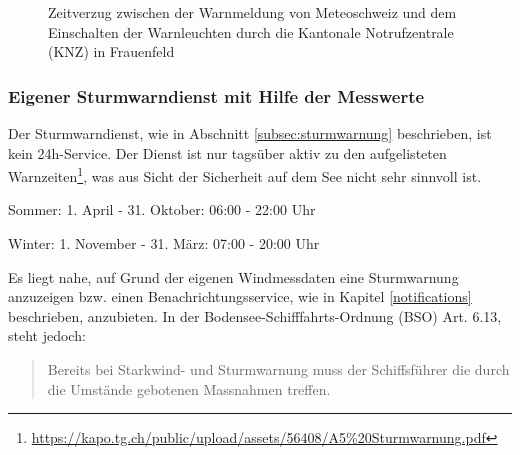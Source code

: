 \begin{figure}[h!]
	\centering
	\caption[Zeitverzug zwischen Sturmwarnmeldung und Anzeige]{Zeitverzug zwischen der Warnmeldung von Meteoschweiz und dem Einschalten der Warnleuchten durch die Kantonale Notrufzentrale (KNZ) in Frauenfeld}
	\label{img:sturmZeit}
\end{figure}


\subsubsection{Eigener Sturmwarndienst mit Hilfe der Messwerte}
Der Sturmwarndienst, wie in Abschnitt \ref{subsec:sturmwarnung} beschrieben, ist kein 24h-Service. Der Dienst ist nur tagsüber aktiv zu den aufgelisteten Warnzeiten\footnote{ \url{https://kapo.tg.ch/public/upload/assets/56408/A5\%20Sturmwarnung.pdf}}, was aus Sicht der Sicherheit auf dem See nicht sehr sinnvoll ist.

\begin{description*}
  \item[Sommer:] 1. April - 31. Oktober: 06:00 - 22:00 Uhr
  \item[Winter: ] 1. November - 31. März: 07:00 - 20:00 Uhr
\end{description*}

\noindent
Es liegt nahe, auf Grund der eigenen Windmessdaten eine Sturmwarnung anzuzeigen bzw. einen Benachrichtungsservice, wie in Kapitel \ref{notifications} beschrieben, anzubieten. In der Bodensee-Schifffahrts-Ordnung (BSO) Art. 6.13, steht jedoch:

\begin{quote}
\flqq Bereits bei Starkwind- und Sturmwarnung muss der Schiffsführer die durch die Umstände gebotenen Massnahmen treffen.\frqq
\end{quote}

